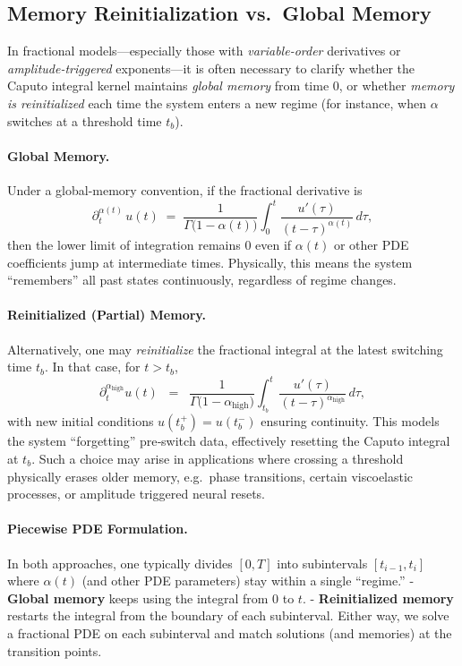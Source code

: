 \documentclass[12pt]{article}
\begin{document}
\subsection{Memory Reinitialization vs.\ Global Memory}
\label{rem:memory_reinit}
In fractional models—especially those with \emph{variable-order} derivatives or 
\emph{amplitude-triggered} exponents—it is often necessary to clarify whether the 
Caputo integral kernel maintains \emph{global memory} from time $0$, or whether 
\emph{memory is reinitialized} each time the system enters a new regime (for instance, 
when $\alpha$ switches at a threshold time $t_b$).

\paragraph{Global Memory.}
Under a global-memory convention, if the fractional derivative is
\[
\partial_t^{\alpha(t)} \,u(t) 
\;=\;
\frac{1}{\Gamma\!\bigl(1-\alpha(t)\bigr)}
\int_{0}^{t}
  \frac{u'(\tau)}{(t-\tau)^{\alpha(t)}}
\,d\tau,
\]
then the lower limit of integration remains $0$ even if $\alpha(t)$ or other PDE coefficients 
jump at intermediate times. Physically, this means the system “remembers” all past states 
continuously, regardless of regime changes.

\paragraph{Reinitialized (Partial) Memory.}
Alternatively, one may \emph{reinitialize} the fractional integral at the latest switching 
time $t_b$. In that case, for $t>t_b$, 
\[
\partial_{t}^{\alpha_{\mathrm{high}}} u(t)
\;\;=\;\;
\frac{1}{\Gamma\!\bigl(1-\alpha_{\mathrm{high}}\bigr)}
\int_{t_b}^{t}
  \frac{u'(\tau)}{(t-\tau)^{\alpha_{\mathrm{high}}}}
\,d\tau,
\]
with new initial conditions $u(t_b^+)=u(t_b^-)$ ensuring continuity. This models the 
system “forgetting” pre‐switch data, effectively resetting the Caputo integral at $t_b$. 
Such a choice may arise in applications where crossing a threshold physically erases 
older memory, e.g.\ phase transitions, certain viscoelastic processes, or amplitude 
triggered neural resets.

\paragraph{Piecewise PDE Formulation.}
In both approaches, one typically divides $[0,T]$ into subintervals $[t_{i-1}, t_i]$ 
where $\alpha(t)$ (and other PDE parameters) stay within a single “regime.” 
- \textbf{Global memory} keeps using the integral from $0$ to $t$. 
- \textbf{Reinitialized memory} restarts the integral from the boundary of each subinterval.  
Either way, we solve a fractional PDE on each subinterval and match solutions (and 
memories) at the transition points. 
\end{document}
